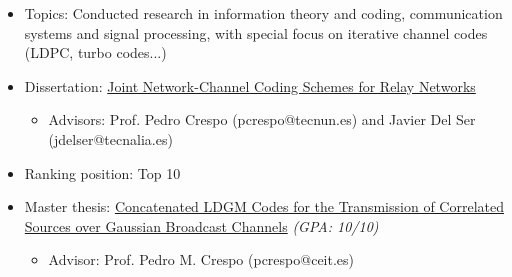 \documentclass[11pt,a4paper,sans]{moderncv}        %
\begin{document}

\vspace{10pt}
\begin{itemize}
 \item{Topics:} Conducted research in information theory and coding, communication systems and signal
processing, with special focus on iterative channel codes (LDPC, turbo codes...)
 \item{Dissertation}: \href{https://stanford.edu/~mhernaez/Thesis_Mikel_Hernaez.pdf}{Joint Network-Channel Coding Schemes for Relay Networks}
 \begin{itemize}
  \item Advisors: Prof. Pedro Crespo (pcrespo@tecnun.es) and Javier Del Ser (jdelser@tecnalia.es)
\end{itemize}
\end{itemize}

\vspace{10pt}
\begin{itemize}
 \item{Ranking position: Top 10}
 \item{Master thesis:} \href{https://stanford.edu/~mhernaez/pfc_imprimir_1.pdf}{Concatenated LDGM Codes for the Transmission of Correlated Sources over Gaussian Broadcast Channels}  \emph{(GPA: 10/10)}
 \begin{itemize}
  \item Advisor: Prof. Pedro M. Crespo (pcrespo@ceit.es)
\end{itemize}
\end{itemize}
\vspace{10pt}

\end{document}
